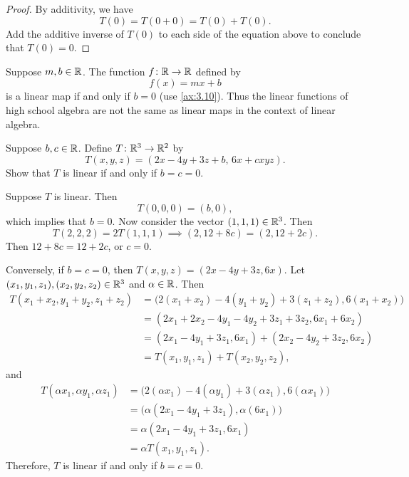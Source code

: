 \begin{proof}
By additivity, we have
\[ T(0)=T(0+0)=T(0)+T(0). \]
Add the additive inverse of $T(0)$ to each side of the equation above to
conclude that $T(0)=0$.
\end{proof}

Suppose $m,b\in\mathbb{R}$. The function $f\colon\mathbb{R}\to\mathbb{R}$ defined by
\[ f(x)=mx+b \]
is a linear map if and only if $b=0$ (use \ref{ax:3.10}). Thus the linear
functions of high school algebra are not the same as linear maps in the
context of linear algebra.


\begin{exercise}
Suppose $b,c\in\mathbb{R}$. Define $T\colon\mathbb{R}^3\to\mathbb{R}^2$ by
\[ T(x,y,z)=(2x-4y+3z+b,\,6x+cxyz). \]
Show that $T$ is linear if and only if $b=c=0$.
\end{exercise}
\begin{solution}
Suppose $T$ is linear. Then
\[ T(0,0,0)=(b,0), \]
which implies that $b=0$. Now consider the vector $(1,1,1)\in\mathbb{R}^3$. Then
\[ T(2,2,2)=2T(1,1,1)\implies(2,12+8c)=(2,12+2c). \]
Then $12+8c=12+2c$, or $c=0$.

Conversely, if $b=c=0$, then $T(x,y,z)=(2x-4y+3z,6x)$. Let
$(x_1,y_1,z_1),\allowbreak(x_2,y_2,z_2)\in\mathbb{R}^3$ and $\alpha\in\mathbb{R}$. Then
\begin{align*}
T(x_1+x_2,y_1+y_2,z_1+z_2)
  &= \bigl(2(x_1+x_2)-4(y_1+y_2)+3(z_1+z_2),6(x_1+x_2)\bigr)\\
  &= (2x_1+2x_2-4y_1-4y_2+3z_1+3z_2,6x_1+6x_2)\\
  &= (2x_1-4y_1+3z_1,6x_1)+(2x_2-4y_2+3z_2,6x_2)\\
  &= T(x_1,y_1,z_1)+T(x_2,y_2,z_2),
\end{align*}
and
\begin{align*}
T(\alpha x_1,\alpha y_1,\alpha z_1)
  &= \bigl(2(\alpha x_1)-4(\alpha y_1)+3(\alpha z_1),6(\alpha x_1)\bigr)\\
  &= \bigl(\alpha(2x_1-4y_1+3z_1),\alpha(6x_1)\bigr)\\
  &= \alpha(2x_1-4y_1+3z_1,6x_1)\\
  &= \alpha T(x_1,y_1,z_1).
\end{align*}
Therefore, $T$ is linear if and only if $b=c=0$.
\end{solution}

